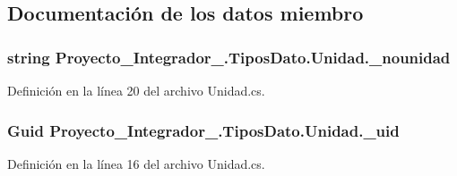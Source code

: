 \subsection{Documentación de los datos miembro}
\hypertarget{class_proyecto___integrador__3_1_1_tipos_dato_1_1_unidad_a02a3cfd664234b1c90c4ea2749928ac2}{
\subsubsection[{\-\_\-nounidad}]{\setlength{\rightskip}{0pt plus 5cm}string Proyecto\-\_\-\-Integrador\-\_.\-Tipos\-Dato.\-Unidad.\-\_\-nounidad\hspace{0.3cm}{\ttfamily [private]}}}\label{class_proyecto___integrador__3_1_1_tipos_dato_1_1_unidad_a02a3cfd664234b1c90c4ea2749928ac2}


Definición en la línea 20 del archivo Unidad.\-cs.

\hypertarget{class_proyecto___integrador__3_1_1_tipos_dato_1_1_unidad_ad0a5b9c3770801a5e32f52d7406346d8}{
\subsubsection[{\-\_\-uid}]{\setlength{\rightskip}{0pt plus 5cm}Guid Proyecto\-\_\-\-Integrador\-\_.\-Tipos\-Dato.\-Unidad.\-\_\-uid\hspace{0.3cm}{\ttfamily [private]}}}\label{class_proyecto___integrador__3_1_1_tipos_dato_1_1_unidad_ad0a5b9c3770801a5e32f52d7406346d8}


Definición en la línea 16 del archivo Unidad.\-cs.



